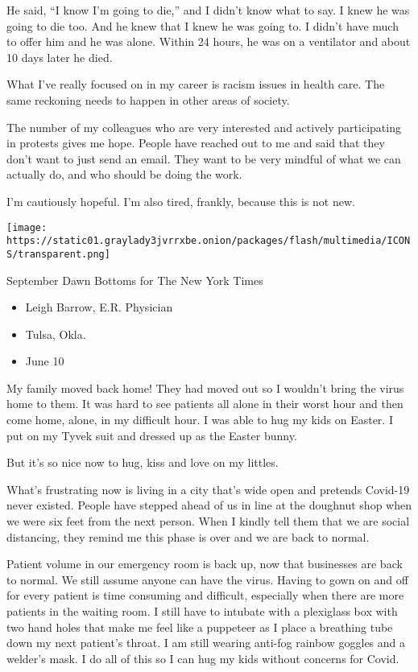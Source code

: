 He said, ``I know I'm going to die,'' and I didn't know what to say. I
knew he was going to die too. And he knew that I knew he was going to. I
didn't have much to offer him and he was alone. Within 24 hours, he was
on a ventilator and about 10 days later he died.

What I've really focused on in my career is racism issues in health
care. The same reckoning needs to happen in other areas of society.

The number of my colleagues who are very interested and actively
participating in protests gives me hope. People have reached out to me
and said that they don't want to just send an email. They want to be
very mindful of what we can actually do, and who should be doing the
work.

I'm cautiously hopeful. I'm also tired, frankly, because this is not
new.

\texttt{[image: https://static01.graylady3jvrrxbe.onion/packages/flash/multimedia/ICONS/transparent.png]}

September Dawn Bottoms for The New York Times

\begin{itemize}
\tightlist
\item
  Leigh Barrow, E.R. Physician
\item
  Tulsa, Okla.
\item
  June 10
\end{itemize}

My family moved back home! They had moved out so I wouldn't bring the
virus home to them. It was hard to see patients all alone in their worst
hour and then come home, alone, in my difficult hour. I was able to hug
my kids on Easter. I put on my Tyvek suit and dressed up as the Easter
bunny.

But it's so nice now to hug, kiss and love on my littles.

What's frustrating now is living in a city that's wide open and pretends
Covid-19 never existed. People have stepped ahead of us in line at the
doughnut shop when we were six feet from the next person. When I kindly
tell them that we are social distancing, they remind me this phase is
over and we are back to normal.

Patient volume in our emergency room is back up, now that businesses are
back to normal. We still assume anyone can have the virus. Having to
gown on and off for every patient is time consuming and difficult,
especially when there are more patients in the waiting room. I still
have to intubate with a plexiglass box with two hand holes that make me
feel like a puppeteer as I place a breathing tube down my next patient's
throat. I am still wearing anti-fog rainbow goggles and a welder's mask.
I do all of this so I can hug my kids without concerns for Covid.

